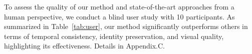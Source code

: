 To assess the quality of our method and state-of-the-art approaches from a human perspective, we conduct a blind user study with 10 participants. As summarized in Table~\ref{tab:user}, our method significantly outperforms others in terms of temporal consistency, identity preservation, and visual quality, highlighting its effectiveness. Details in Appendix.C.